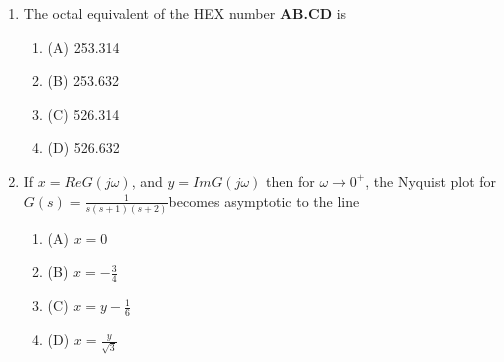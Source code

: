 \documentclass[journal]{IEEEtran}
\numberwithin{equation}{enumi}
\numberwithin{figure}{enumi}
\begin{document}
\begin{enumerate}
\begin{figure}[!ht]
    \caption{}
    \end{figure}
    \\\\The bus voltage phase angular difference between generator bus X and generator bus Y after the interconnection is
    \begin{multicols}{4}
    \begin{enumerate}
        \item $10^\circ$
        \item $25^\circ$
        \item $-30^\circ$
        \item $30^\circ$
    \end{enumerate}
    \end{multicols}
    \bigskip
    \item The octal equivalent of the HEX number \textbf{AB.CD} is
    \begin{multicols}{4}
    \begin{enumerate}
        \item (A) 253.314
        \item (B) 253.632
        \item (C) 526.314
        \item (D) 526.632
    \end{enumerate}
    \end{multicols}
    \bigskip
    \item If $x = Re G(j\omega)$, and $y = Im G(j\omega)$ then for $ \omega \to 0^{+} $, the Nyquist plot for $G(s) = \frac{1}{s(s+1)(s+2)}$becomes asymptotic to the line
    \begin{multicols}{4}
    \begin{enumerate}
        \item (A) $x = 0$
        \item (B) $x = -\frac{3}{4}$
        \item (C) $x = y - \frac{1}{6}$
        \item (D) $x = \frac{y}{\sqrt{3}}$
    \end{enumerate}
    \end{multicols}
    \bigskip

\end{enumerate}
\end{document}
